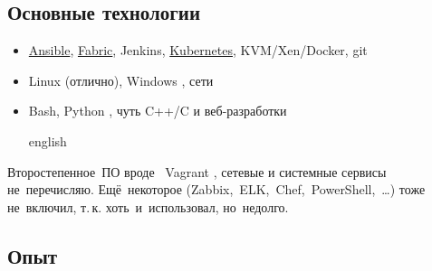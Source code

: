 \documentclass[11pt, a4paper]{article}
\newcommand{\Delimitline}{
  \vspace{-2ex}
  \noindent\makebox[\linewidth]{\rule{\DelimitlineLength}{0.12ex}} }
\newcommand\Eng[1]{%
  \foreignlanguage{english}{#1}%
}
\let\it\textit
\newcommand{\forceindent}{\leavevmode{\parindent=1.5em\indent}}
\begin{document}
\subsection*{{Основные технологии}}
\Delimitline

\begin{itemize}
  \item \href{https://github.com/bititanb/ansible-taskmngr}{Ansible}, \href{https://bitbucket.org/bititanb/ivd-fabric/src}{Fabric}, Jenkins, \href{https://github.com/bititanb/ansible-taskmngr/tree/master/roles/taskmngr-kubernetes/templates}{Kubernetes}, KVM/Xen/Docker, git
  \item \Eng{Linux} (отлично), \Eng{Windows}, сети
  \item \Eng{Bash, Python}, чуть \Eng{C++/C} и веб-разработки
  \begin{otherlanguage*}{english}
  \end{otherlanguage*}
\end{itemize}

\forceindent Второстепенное~ПО вроде~\Eng{Vagrant}, сетевые и системные сервисы не~перечисляю.
Ещё~некоторое \Eng{(Zabbix,~ELK,~Chef,~PowerShell,~\dots)} тоже не~включил, т.\,к. хоть~и~использовал, но~недолго.

\subsection*{{Опыт}}
\Delimitline

\begin{spacing}{0.8}
\end{spacing}
\end{document}
